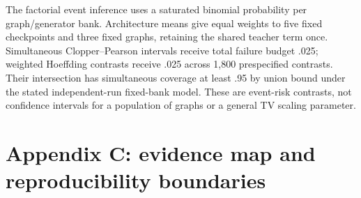 \documentclass[
  11pt,
]{article}
\begin{document}
The factorial event inference uses a saturated binomial probability per
graph/generator bank. Architecture means give equal weights to five
fixed checkpoints and three fixed graphs, retaining the shared teacher
term once. Simultaneous Clopper--Pearson intervals receive total failure
budget .025; weighted Hoeffding contrasts receive .025 across 1,800
prespecified contrasts. Their intersection has simultaneous coverage at
least .95 by union bound under the stated independent-run fixed-bank
model. These are event-risk contrasts, not confidence intervals for a
population of graphs or a general TV scaling parameter.

\section{Appendix C: evidence map and reproducibility
boundaries}\label{appendix-c-evidence-map-and-reproducibility-boundaries}
\end{document}
